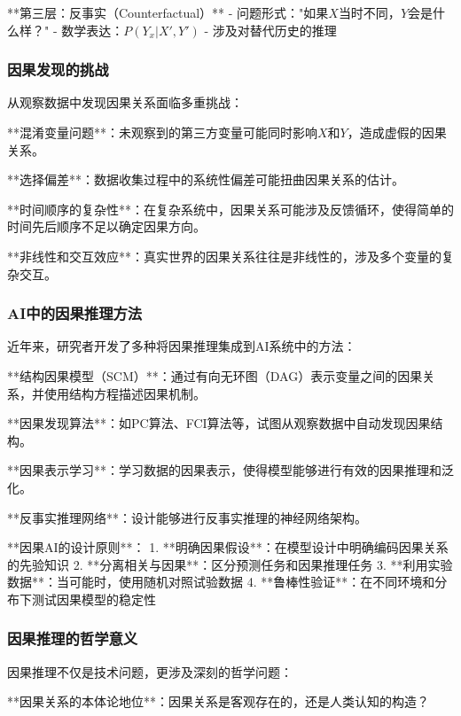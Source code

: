 **第三层：反事实（Counterfactual）**
- 问题形式："如果$X$当时不同，$Y$会是什么样？"
- 数学表达：$P(Y_x|X',Y')$
- 涉及对替代历史的推理

\subsubsection{因果发现的挑战}

从观察数据中发现因果关系面临多重挑战：

**混淆变量问题**：未观察到的第三方变量可能同时影响$X$和$Y$，造成虚假的因果关系。

**选择偏差**：数据收集过程中的系统性偏差可能扭曲因果关系的估计。

**时间顺序的复杂性**：在复杂系统中，因果关系可能涉及反馈循环，使得简单的时间先后顺序不足以确定因果方向。

**非线性和交互效应**：真实世界的因果关系往往是非线性的，涉及多个变量的复杂交互。

\subsubsection{AI中的因果推理方法}

近年来，研究者开发了多种将因果推理集成到AI系统中的方法：

**结构因果模型（SCM）**：通过有向无环图（DAG）表示变量之间的因果关系，并使用结构方程描述因果机制。

**因果发现算法**：如PC算法、FCI算法等，试图从观察数据中自动发现因果结构。

**因果表示学习**：学习数据的因果表示，使得模型能够进行有效的因果推理和泛化。

**反事实推理网络**：设计能够进行反事实推理的神经网络架构。

\begin{center}
**因果AI的设计原则**：
1. **明确因果假设**：在模型设计中明确编码因果关系的先验知识
2. **分离相关与因果**：区分预测任务和因果推理任务
3. **利用实验数据**：当可能时，使用随机对照试验数据
4. **鲁棒性验证**：在不同环境和分布下测试因果模型的稳定性
\end{center}

\subsubsection{因果推理的哲学意义}

因果推理不仅是技术问题，更涉及深刻的哲学问题：

**因果关系的本体论地位**：因果关系是客观存在的，还是人类认知的构造？

